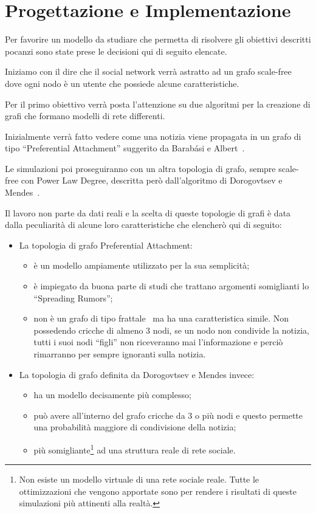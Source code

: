 \newpage
\section{Progettazione e Implementazione}
\label{section:implementazione}
\vspace{10 mm}


Per favorire un modello da studiare che permetta di risolvere gli obiettivi descritti 
pocanzi sono state prese le decisioni qui di seguito elencate.

Iniziamo con il dire che il social network verrà astratto ad un grafo scale-free dove ogni 
nodo è un utente che possiede alcune caratteristiche.

Per il primo obiettivo verrà posta l'attenzione su due algoritmi per la creazione di grafi che 
formano modelli di rete differenti.

Inizialmente verrà fatto vedere come una notizia viene propagata in un grafo di tipo 
``Preferential Attachment'' suggerito da Barabási e Albert~\cite{biblio:barabasilab_emergence}.

Le simulazioni poi proseguiranno con un altra topologia di grafo, sempre scale-free 
con Power Law Degree, descritta però dall'algoritmo di Dorogovtsev e Mendes~\cite{biblio:evolution_networks}.

Il lavoro non parte da dati reali e la scelta di queste topologie di grafi è data 
dalla peculiarità di alcune loro caratteristiche che elencherò qui di seguito:
\begin{itemize}
 \item La topologia di grafo Preferential Attachment:
 \begin{itemize}
  \item è un modello ampiamente utilizzato per la sua semplicità;
  \item è impiegato da buona parte di studi che trattano argomenti somiglianti lo ``Spreading Rumors'';
  \item non è un grafo di tipo frattale~\cite{biblio:fractal_resistant_disease} ma ha una caratteristica simile. 
 Non possedendo cricche di almeno 3 nodi, se un nodo non condivide la notizia, 
 tutti i suoi nodi ``figli'' non riceveranno mai l'informazione e perciò rimarranno per sempre ignoranti sulla notizia.
 \end{itemize}
 
 \item La topologia di grafo definita da Dorogovtsev e Mendes invece:
  \begin{itemize}
  \item ha un modello decisamente più complesso;
  \item può avere all'interno del grafo cricche da 3 o più nodi e questo permette una probabilità maggiore di condivisione della notizia;
  \item più somigliante\footnote{\scriptsize Non esiste un modello virtuale di una rete sociale reale. 
  Tutte le ottimizzazioni che vengono apportate sono per rendere i risultati di queste simulazioni più attinenti alla realtà.}
  ad una struttura reale di rete sociale.
 \end{itemize}
\end{itemize}

